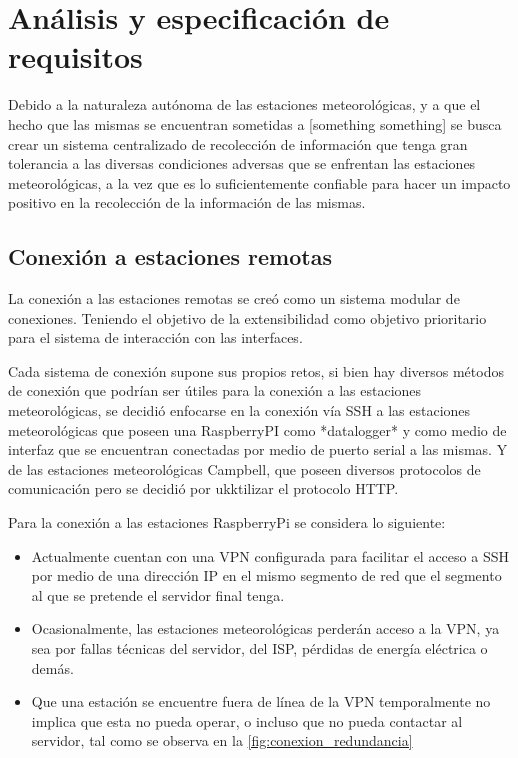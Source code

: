 
\section{Análisis y especificación de requisitos}

Debido a la naturaleza autónoma de las estaciones meteorológicas, y a que el hecho que las mismas se encuentran sometidas a [something something] se busca crear un sistema centralizado de recolección de información que tenga gran tolerancia a las diversas condiciones adversas que se enfrentan las estaciones meteorológicas, a la vez que es lo suficientemente confiable para hacer un impacto positivo en la recolección de la información de las mismas.

\subsection{Conexión a estaciones remotas}

La conexión a las estaciones remotas se creó como un sistema modular de conexiones. Teniendo el objetivo de la extensibilidad como objetivo prioritario para el sistema de interacción con las interfaces.

Cada sistema de conexión supone sus propios retos, si bien hay diversos métodos de conexión que podrían ser útiles para la conexión a las estaciones meteorológicas, se decidió enfocarse en la conexión vía SSH a las estaciones meteorológicas que poseen una RaspberryPI como *datalogger* y como medio de interfaz que se encuentran conectadas por medio de puerto serial a las mismas. Y de las estaciones meteorológicas Campbell, que poseen diversos protocolos de comunicación pero se decidió por ukktilizar el protocolo HTTP.

Para la conexión a las estaciones RaspberryPi se considera lo siguiente:

\begin{itemize}
   \item Actualmente cuentan con una VPN configurada para facilitar el acceso a SSH por medio de una dirección IP en el mismo segmento de red que el segmento al que se pretende el servidor final tenga.
   \item Ocasionalmente, las estaciones meteorológicas perderán acceso a la VPN, ya sea por fallas técnicas del servidor, del ISP, pérdidas de energía eléctrica o demás.
   \item Que una estación se encuentre fuera de línea de la VPN temporalmente no implica que esta no pueda operar, o incluso que no pueda contactar al servidor, tal como se observa en la \ref{fig:conexion_redundancia}
\end{itemize}

